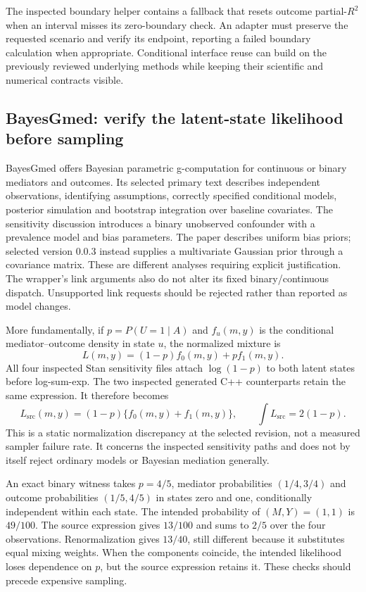 The inspected boundary helper contains a fallback that resets outcome
partial-$R^2$ when an interval misses its zero-boundary check. An adapter must
preserve the requested scenario and verify its endpoint, reporting a failed
boundary calculation when appropriate. Conditional interface reuse can build
on the previously reviewed underlying methods while keeping their scientific
and numerical contracts visible. \citep{exec25_rmed_tipr,exec25_rmed_choice}

\subsection{BayesGmed: verify the latent-state likelihood before sampling}

BayesGmed offers Bayesian parametric g-computation for continuous or binary
mediators and outcomes. Its selected primary text describes independent
observations, identifying assumptions, correctly specified conditional models,
posterior simulation and bootstrap integration over baseline covariates.
The sensitivity discussion introduces a binary unobserved confounder with a
prevalence model and bias parameters. The paper describes uniform bias priors;
selected version 0.0.3 instead supplies a multivariate Gaussian prior through a
covariance matrix. These are different analyses requiring explicit justification.
The wrapper's link arguments also do not alter its fixed binary/continuous
dispatch. Unsupported link requests should be rejected rather than reported
as model changes. \citep{exec25_rmed_yimer_paper,exec25_rmed_bayesgmed}

More fundamentally, if $p=P(U=1\mid A)$ and $f_u(m,y)$ is the conditional
mediator--outcome density in state $u$, the normalized mixture is
\[
 L(m,y)=(1-p)f_0(m,y)+p f_1(m,y).
\]
All four inspected Stan sensitivity files attach $\log(1-p)$ to both latent
states before log-sum-exp. The two inspected generated C++ counterparts retain
the same expression. It therefore becomes
\[
 L_{\mathrm{src}}(m,y)=(1-p)\{f_0(m,y)+f_1(m,y)\},
 \qquad \int L_{\mathrm{src}}=2(1-p).
\]
This is a static normalization discrepancy at the selected revision, not a
measured sampler failure rate. It concerns the inspected sensitivity paths
and does not by itself reject ordinary models or Bayesian mediation generally.
\citep{exec25_rmed_bayesgmed}

An exact binary witness takes $p=4/5$, mediator probabilities $(1/4,3/4)$ and
outcome probabilities $(1/5,4/5)$ in states zero and one, conditionally
independent within each state. The intended probability of $(M,Y)=(1,1)$ is
$49/100$. The source expression gives $13/100$ and sums to $2/5$ over the
four observations. Renormalization gives $13/40$, still different because it
substitutes equal mixing weights. When the components coincide, the intended
likelihood loses dependence on $p$, but the source expression retains it.
These checks should precede expensive sampling. \citep{exec25_rmed_choice}

